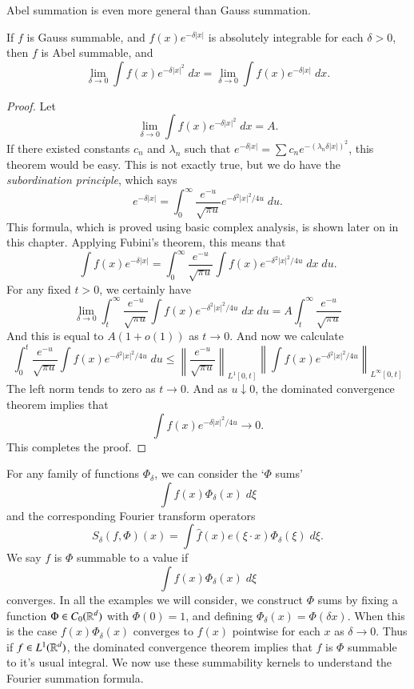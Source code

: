 Abel summation is even more general than Gauss summation.

\begin{lemma}
    If $f$ is Gauss summable, and $f(x) e^{-\delta |x|}$ is absolutely integrable for each $\delta > 0$, then $f$ is Abel summable, and
    \[ \lim_{\delta \to 0} \int f(x) e^{-\delta |x|^2}\; dx = \lim_{\delta \to 0} \int f(x) e^{-\delta |x|}\; dx. \]
\end{lemma}
\begin{proof}
    Let
    \[ \lim_{\delta \to 0} \int f(x) e^{-\delta |x|^2}\; dx = A. \]
    If there existed constants $c_n$ and $\lambda_n$ such that $e^{-\delta |x|} = \sum c_n e^{-(\lambda_n \delta |x|)^2}$, this theorem would be easy. This is not exactly true, but we do have the {\it subordination principle}, which says
    \[ e^{-\delta |x|} = \int_0^\infty \frac{e^{-u}}{\sqrt{\pi u}} e^{-\delta^2 |x|^2/4u}\; du. \]
    This formula, which is proved using basic complex analysis, is shown later on in this chapter. Applying Fubini's theorem, this means that
    \[ \int f(x) e^{-\delta |x|} = \int_0^\infty \frac{e^{-u}}{\sqrt{\pi u}} \int f(x) e^{-\delta^2 |x|^2/4u}\; dx\; du. \]
    For any fixed $t > 0$, we certainly have
    \[ \lim_{\delta \to 0} \int_t^\infty \frac{e^{-u}}{\sqrt{\pi u}} \int f(x) e^{-\delta^2 |x|^2/4u}\; dx\; du = A \int_t^\infty \frac{e^{-u}}{\sqrt{\pi u}} \]
    And this is equal to $A(1 + o(1))$ as $t \to 0$. And now we calculate
    \[ \int_0^t \frac{e^{-u}}{\sqrt{\pi u}} \int f(x) e^{-\delta^2 |x|^2/4u}\; du \leq \left\| \frac{e^{-u}}{\sqrt{\pi u}} \right\|_{L^1[0,t]} \left\| \int f(x) e^{-\delta^2 |x|^2/4u} \right\|_{L^\infty[0,t]} \]
    The left norm tends to zero as $t \to 0$. And as $u \downarrow 0$, the dominated convergence theorem implies that
    \[ \int f(x) e^{-\delta |x|^2/4u} \to 0. \]
    This completes the proof.
\end{proof}

For any family of functions $\Phi_\delta$, we can consider the `$\Phi$ sums'
%
\[ \int f(x) \Phi_\delta(x)\; d\xi \]
%
and the corresponding Fourier transform operators
%
\[ S_\delta(f,\Phi)(x) = \int \widehat{f}(x) e(\xi \cdot x) \Phi_\delta(\xi)\; d\xi. \]
%
We say $f$ is $\Phi$ summable to a value if
%
\[ \int f(x) \Phi_\delta(x)\; d\xi \]
%
converges. In all the examples we will consider, we construct $\Phi$ sums by fixing a function $\Phi \in C_0(\operatorname{\mathbb{R}}^d)$ with $\Phi(0) = 1$, and defining $\Phi_\delta(x) = \Phi(\delta x)$. When this is the case $f(x) \Phi_\delta(x)$ converges to $f(x)$ pointwise for each $x$ as $\delta \to 0$. Thus if $f \in L^1(\operatorname{\mathbb{R}}^d)$, the dominated convergence theorem implies that $f$ is $\Phi$ summable to it's usual integral. We now use these summability kernels to understand the Fourier summation formula.

